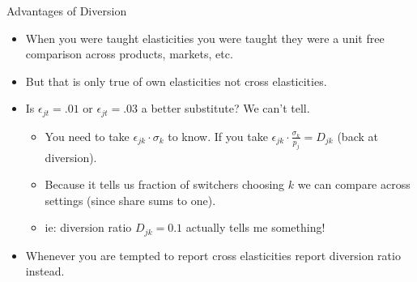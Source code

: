 \documentclass[aspectratio=169,10pt]{beamer}
\begin{document}
\begin{frame}{Advantages of Diversion}
\begin{itemize}
\item When you were taught elasticities you were taught they were a \alert{unit free} comparison across products, markets, etc.
\item But that is only true of \alert{own elasticities} not cross elasticities.
\item Is $\epsilon_{jt}=.01$ or $\epsilon_{jt}=.03$ a better substitute? We can't tell.
\begin{itemize}
\item You need to take $\epsilon_{jk} \cdot \sigma_k$ to know. If you take $\epsilon_{jk} \cdot \frac{\sigma_k}{p_j} = D_{jk}$ (back at diversion).
\item Because it tells us \alert{fraction of switchers} choosing $k$ we can compare across settings (since share sums to one).
\item ie: diversion ratio $D_{jk} = 0.1$ actually tells me something!
\end{itemize}
\item Whenever you are tempted to report \alert{cross elasticities} report \alert{diversion ratio} instead.
\end{itemize}
\end{frame}
\end{document}
